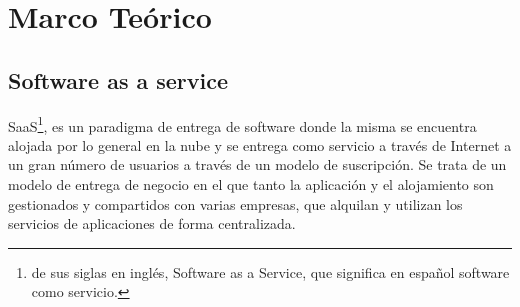 \section{Marco Teórico}





\subsection{Software as a service}
SaaS\footnote{de sus siglas en inglés, Software as a Service, que significa en español software como servicio.}, es un paradigma de entrega de software donde la misma se encuentra alojada por lo general en la nube y se entrega como servicio a través de Internet a un gran número de usuarios a través de un modelo de suscripción. Se trata de un modelo de entrega de negocio en el que tanto la aplicación y el alojamiento son gestionados y compartidos con varias empresas, que alquilan y utilizan los servicios de aplicaciones de forma centralizada\citep{gupta_software_2014}.

